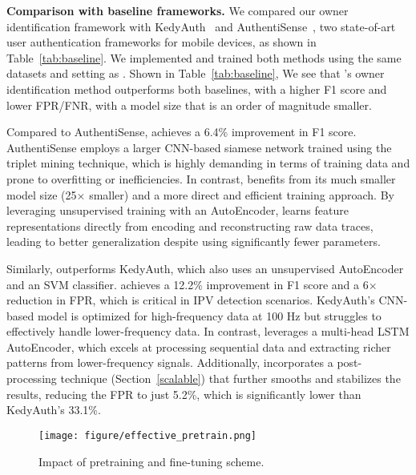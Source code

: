     \noindent\textbf{Comparison with baseline frameworks.} We compared our owner identification framework with KedyAuth~\cite{huh2023long} and AuthentiSense~\cite{fereidooni2023authentisense}, two state-of-art user authentication frameworks for mobile devices, as shown in Table~\ref{tab:baseline}. We implemented and trained both methods using the same datasets and setting as \sys. Shown in Table~\ref{tab:baseline}, We see that \sys's owner identification method outperforms both baselines, with a higher F1 score and lower FPR/FNR, with a model size that is an order of magnitude smaller.

    Compared to AuthentiSense, \sys achieves a 6.4\% improvement in F1 score. AuthentiSense employs a larger CNN-based siamese network trained using the triplet mining technique, which is highly demanding in terms of training data and prone to overfitting or inefficiencies. In contrast, \sys benefits from its much smaller model size (25$\times$ smaller) and a more direct and efficient training approach. By leveraging unsupervised training with an AutoEncoder, \sys learns feature representations directly from encoding and reconstructing raw data traces, leading to better generalization despite using significantly fewer parameters.

    Similarly, \sys outperforms KedyAuth, which also uses an unsupervised AutoEncoder and an SVM classifier. \sys achieves a 12.2\% improvement in F1 score and a 6$\times$ reduction in FPR, which is critical in IPV detection scenarios. KedyAuth's CNN-based model is optimized for high-frequency data at 100 Hz but struggles to effectively handle lower-frequency data. In contrast, \sys leverages a multi-head LSTM AutoEncoder, which excels at processing sequential data and extracting richer patterns from lower-frequency signals. Additionally, \sys incorporates a post-processing technique (Section~\ref{scalable}) that further smooths and stabilizes the results, reducing the FPR to just 5.2\%, which is significantly lower than KedyAuth's 33.1\%.
    



            \begin{figure}[htbp!]
                \centering\texttt{[image: figure/effective\_pretrain.png]}%
            \caption{Impact of pretraining and fine-tuning scheme.}\label{fig:pretrain_effect}
            \end{figure}

